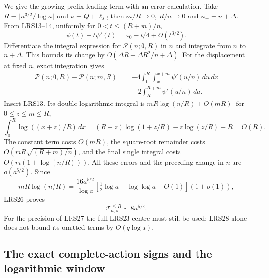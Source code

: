 \documentclass[11pt,a4paper]{article}
\begin{document}
We give the growing-prefix leading term with an error calculation.
Take $R=\lfloor a^{3/2}/\log a\rfloor$ and $n=Q+\ell_s$; then
$m/R\to0$, $R/n\to0$ and $n_+=n+\Delta$.
From LRS13--14, uniformly for $0<t\le(R+m)/n$,
\[
 \psi(t)-t\psi'(t)=a_0-t/4+O(t^{3/2}).
\]
Differentiate the integral expression for $\mathscr P(n;0,R)$ in
$n$ and integrate from $n$ to $n+\Delta$.  This bounds its change by
$O(\Delta R+\Delta R^2/n+\Delta)$.
For the displacement at fixed $n$, exact integration gives
\[
\begin{split}
 \mathscr P(n;0,R)-\mathscr P(n;m,R)
 &=-4\int_0^R\int_x^{x+m}\psi'(u/n)\,du\,dx\\
 &\quad-2\int_R^{R+m}\psi'(u/n)\,du.
\end{split}
\]
Insert LRS13.  Its double logarithmic integral is
$mR\log(n/R)+O(mR)$: for $0\le z\le m\le R$,
\[
 \int_0^R\log((x+z)/R)\,dx
 =(R+z)\log(1+z/R)-z\log(z/R)-R=O(R).
\]
The constant term costs $O(mR)$, the square-root remainder costs
$O(mR\sqrt{(R+m)/n})$, and the final single integral costs
$O(m(1+\log(n/R)))$.  All these errors and the preceding change
in $n$ are $o(a^{5/2})$.  Since
\[
 mR\log(n/R)
 =\frac{16a^{5/2}}{\log a}
      [\tfrac12\log a+\log\log a+O(1)](1+o(1)),
\]
LRS26 proves
\begin{equation}\tag{LRS28}
 \mathcal T_{a,s}^{\le R}\sim8a^{5/2}.
\end{equation}
For the precision of LRS27 the full LRS23 centre must still be used;
LRS28 alone does not bound its omitted terms by $O(q\log a)$.

\subsection{The exact complete-action signs and the logarithmic window}
\end{document}
